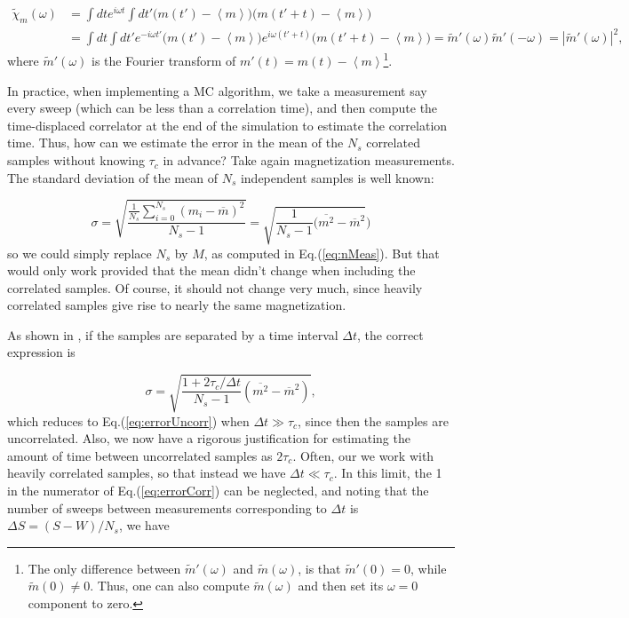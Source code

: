 \begin{equation}
\begin{split}
\tilde{\chi}_m ( \omega ) &= \int dt e^{i\omega t} \int dt' \bigg( m ( t' ) - \left\langle m \right\rangle \bigg) \bigg( m ( t' + t ) - \left\langle m \right\rangle \bigg) \\
&= \int dt \int dt' e^{-i\omega t'} \bigg( m ( t' ) - \left\langle m \right\rangle \bigg) e^{i\omega ( t' + t )} \bigg( m ( t' + t ) - \left\langle m \right\rangle \bigg) = \tilde{m}' (\omega) \tilde{m}' (- \omega) = | \tilde{m}' (\omega) |^2 ,
\end{split} 
\end{equation}
where $\tilde{m}' (\omega)$ is the Fourier transform of $m' (t) = m(t) - \left\langle m \right\rangle$\footnote{The only difference between $\tilde{m}' (\omega)$ and $\tilde{m} (\omega)$, is that $\tilde{m}' (0) = 0$, while $\tilde{m} (0) \neq 0$. Thus, one can also compute $\tilde{m} (\omega)$ and then set its $\omega = 0$ component to zero.}.

In practice, when implementing a MC algorithm, we take a measurement say every sweep (which can be less than a correlation time), and then compute the time-displaced correlator at the end of the simulation to estimate the correlation time.
Thus, how can we estimate the error in the mean of the $N_s$ correlated samples without knowing $\tau_c$ in advance?
Take again magnetization measurements.
The standard deviation of the mean of $N_s$ independent samples is well known:

\begin{equation}\label{eq:errorUncorr}
\sigma = \sqrt{ \frac{ \frac{1}{N_s} \sum_{i=0}^{N_s} ( m_i - \overline{m} )^2 }{N_s - 1} } = \sqrt{ \frac{1}{N_s - 1} ( \overline{m^2} - \overline{m}^2 } )
\end{equation}
so we could simply replace $N_s$ by $M$, as computed in Eq.(\ref{eq:nMeas}).
But that would only work provided that the mean didn't change when including the correlated samples.
Of course, it should not change very much, since heavily correlated samples give rise to nearly the same magnetization.

As shown in \cite{muller-krumbhaar_dynamic_1973}, if the samples are separated by a time interval $\Delta t$,  the correct expression is

\begin{equation}\label{eq:errorCorr}
\sigma = \sqrt{ \frac{1 + 2\tau_c / \Delta t}{N_s - 1} ( \overline{m^2} - \overline{m}^2 )  } ,
\end{equation}
which reduces to Eq.(\ref{eq:errorUncorr}) when $\Delta t \gg \tau_c$, since then the samples are uncorrelated.
Also, we now have a rigorous justification for estimating the amount of time between uncorrelated samples as $2\tau_c$.
Often, our we work with heavily correlated samples, so that instead we have $\Delta t \ll \tau_c$.
In this limit, the 1 in the numerator of Eq.(\ref{eq:errorCorr}) can be neglected, and noting that the number of sweeps between measurements corresponding to $\Delta t$ is $\Delta S = (S - W ) / N_s$, we have

